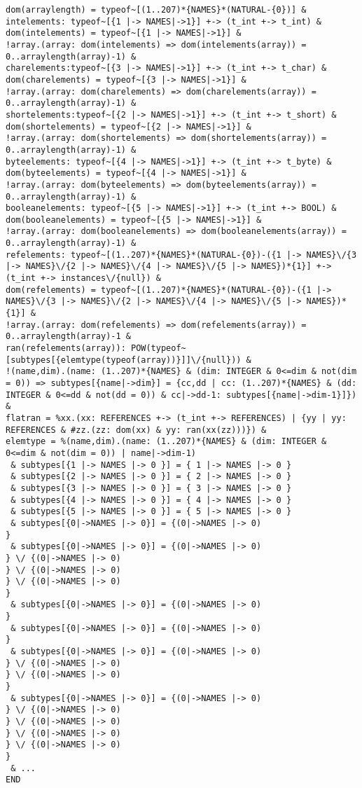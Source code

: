 \begin{verbatim}
dom(arraylength) = typeof~[(1..207)*{NAMES}*(NATURAL-{0})] & 
intelements: typeof~[{1 |-> NAMES|->1}] +-> (t_int +-> t_int) &
dom(intelements) = typeof~[{1 |-> NAMES|->1}] & 
!array.(array: dom(intelements) => dom(intelements(array)) = 0..arraylength(array)-1) & 
charelements:typeof~[{3 |-> NAMES|->1}] +-> (t_int +-> t_char) &
dom(charelements) = typeof~[{3 |-> NAMES|->1}] & 
!array.(array: dom(charelements) => dom(charelements(array)) = 0..arraylength(array)-1) & 
shortelements:typeof~[{2 |-> NAMES|->1}] +-> (t_int +-> t_short) &
dom(shortelements) = typeof~[{2 |-> NAMES|->1}] & 
!array.(array: dom(shortelements) => dom(shortelements(array)) = 0..arraylength(array)-1) & 
byteelements: typeof~[{4 |-> NAMES|->1}] +-> (t_int +-> t_byte) &
dom(byteelements) = typeof~[{4 |-> NAMES|->1}] & 
!array.(array: dom(byteelements) => dom(byteelements(array)) = 0..arraylength(array)-1) & 
booleanelements: typeof~[{5 |-> NAMES|->1}] +-> (t_int +-> BOOL) &
dom(booleanelements) = typeof~[{5 |-> NAMES|->1}] & 
!array.(array: dom(booleanelements) => dom(booleanelements(array)) = 0..arraylength(array)-1) & 
refelements: typeof~[(1..207)*{NAMES}*(NATURAL-{0})-({1 |-> NAMES}\/{3 |-> NAMES}\/{2 |-> NAMES}\/{4 |-> NAMES}\/{5 |-> NAMES})*{1}] +-> (t_int +-> instances\/{null}) &
dom(refelements) = typeof~[(1..207)*{NAMES}*(NATURAL-{0})-({1 |-> NAMES}\/{3 |-> NAMES}\/{2 |-> NAMES}\/{4 |-> NAMES}\/{5 |-> NAMES})*{1}] & 
!array.(array: dom(refelements) => dom(refelements(array)) = 0..arraylength(array)-1 & 
ran(refelements(array)): POW(typeof~[subtypes[{elemtype(typeof(array))}]]\/{null})) & 
!(name,dim).(name: (1..207)*{NAMES} & (dim: INTEGER & 0<=dim & not(dim = 0)) => subtypes[{name|->dim}] = {cc,dd | cc: (1..207)*{NAMES} & (dd: INTEGER & 0<=dd & not(dd = 0)) & cc|->dd-1: subtypes[{name|->dim-1}]}) & 
flatran = %xx.(xx: REFERENCES +-> (t_int +-> REFERENCES) | {yy | yy: REFERENCES & #zz.(zz: dom(xx) & yy: ran(xx(zz)))}) & 
elemtype = %(name,dim).(name: (1..207)*{NAMES} & (dim: INTEGER & 0<=dim & not(dim = 0)) | name|->dim-1)
 & subtypes[{1 |-> NAMES |-> 0 }] = { 1 |-> NAMES |-> 0 }
 & subtypes[{2 |-> NAMES |-> 0 }] = { 2 |-> NAMES |-> 0 }
 & subtypes[{3 |-> NAMES |-> 0 }] = { 3 |-> NAMES |-> 0 }
 & subtypes[{4 |-> NAMES |-> 0 }] = { 4 |-> NAMES |-> 0 }
 & subtypes[{5 |-> NAMES |-> 0 }] = { 5 |-> NAMES |-> 0 }
 & subtypes[{0|->NAMES |-> 0}] = {(0|->NAMES |-> 0)
}
 & subtypes[{0|->NAMES |-> 0}] = {(0|->NAMES |-> 0)
} \/ {(0|->NAMES |-> 0)
} \/ {(0|->NAMES |-> 0)
} \/ {(0|->NAMES |-> 0)
}
 & subtypes[{0|->NAMES |-> 0}] = {(0|->NAMES |-> 0)
}
 & subtypes[{0|->NAMES |-> 0}] = {(0|->NAMES |-> 0)
}
 & subtypes[{0|->NAMES |-> 0}] = {(0|->NAMES |-> 0)
} \/ {(0|->NAMES |-> 0)
} \/ {(0|->NAMES |-> 0)
}
 & subtypes[{0|->NAMES |-> 0}] = {(0|->NAMES |-> 0)
} \/ {(0|->NAMES |-> 0)
} \/ {(0|->NAMES |-> 0)
} \/ {(0|->NAMES |-> 0)
} \/ {(0|->NAMES |-> 0)
}
 & ...
END
 \end{verbatim}
